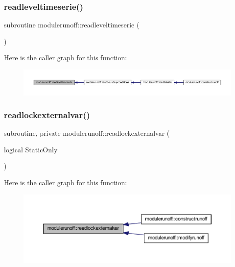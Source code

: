 \subsubsection{\texorpdfstring{readleveltimeserie()}{readleveltimeserie()}}
{\footnotesize\ttfamily subroutine modulerunoff\+::readleveltimeserie (\begin{DoxyParamCaption}{ }\end{DoxyParamCaption})\hspace{0.3cm}{\ttfamily [private]}}

Here is the caller graph for this function\+:
\nopagebreak
\begin{figure}[H]
\begin{center}
\leavevmode
\includegraphics[width=350pt]{namespacemodulerunoff_a16bc6313240379de466a61574c8dbc1d_icgraph}
\end{center}
\end{figure}
\mbox{\label{namespacemodulerunoff_ae46242484733cacdd1c5d484f4e6eba7}} 
\subsubsection{\texorpdfstring{readlockexternalvar()}{readlockexternalvar()}}
{\footnotesize\ttfamily subroutine, private modulerunoff\+::readlockexternalvar (\begin{DoxyParamCaption}\item[{logical}]{Static\+Only }\end{DoxyParamCaption})\hspace{0.3cm}{\ttfamily [private]}}

Here is the caller graph for this function\+:
\nopagebreak
\begin{figure}[H]
\begin{center}
\leavevmode
\includegraphics[width=350pt]{namespacemodulerunoff_ae46242484733cacdd1c5d484f4e6eba7_icgraph}
\end{center}
\end{figure}
\mbox{\label{namespacemodulerunoff_a900316fc0130b378405b9b03d84eb9cd}} 

